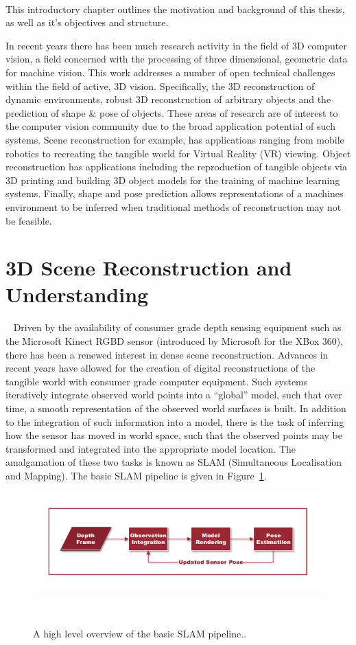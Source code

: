 ~\label{chap:intro}
\begin{chapterabstract}
This introductory chapter outlines the motivation and background of this thesis, as well as it's objectives 
and structure.
\end{chapterabstract}

In recent years there has been much research activity in the field of 3D computer vision, a field concerned 
with the processing of three dimensional, geometric data for machine vision. This work addresses a number of 
open technical challenges within the field of active, 3D vision. Specifically, the 3D reconstruction of 
dynamic environments, robust 3D reconstruction of arbitrary objects and the prediction of shape \& pose of 
objects. These areas of research are of interest to the computer vision community due to the broad application 
potential of such systems. Scene reconstruction for example, has applications ranging from mobile robotics to 
recreating the tangible world for Virtual Reality (VR) viewing. Object reconstruction has applications including 
the reproduction of tangible objects via 3D printing and building 3D object models for the training of machine 
learning systems. Finally, shape and pose prediction allows representations of a machines environment to be 
inferred when traditional methods of reconstruction may not be feasible.

\section{3D Scene Reconstruction and Understanding}
~\label{sec:intro_scene_recon}
Driven by the availability of consumer grade depth sensing equipment such as the Microsoft Kinect RGBD sensor 
(introduced by Microsoft for the XBox 360), there has been a renewed interest in dense scene reconstruction. 
Advances in recent years have allowed for the creation of digital reconstructions of the tangible world with 
consumer grade computer equipment. Such systems iteratively integrate observed world points into a ``global'' 
model, such that over time, a smooth representation of the observed world surfaces is built. In addition to the 
integration of such information into a model, there is the task of inferring how the sensor has moved in world 
space, such that the observed points may be transformed and integrated into the appropriate model location. The 
amalgamation of these two tasks is known as SLAM (Simultaneous Localisation and Mapping). The basic SLAM pipeline 
is given in Figure~\ref{figure:basic_slam}.
\begin{figure}[!htbp]
  \centering
  \includegraphics[width=.7\linewidth]{figures/intro/basic_slam.pdf}
  \caption[Basic SLAM Pipeline]{A high level overview of the basic SLAM pipeline..}
~\label{figure:basic_slam}
\end{figure}

